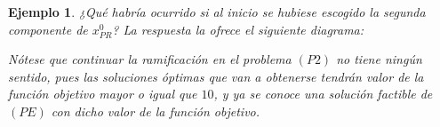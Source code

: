 \documentclass[11pt]{report}
\def\textA{
\scriptsize{$\begin{aligned}[t]
    x^0_{PR} &= (0.8,1.6)^t \\
    z^0_{PR} &= 8.8
\end{aligned}$}
\nodepart{two}
{\scriptsize{$9 \leq z^0_{PE}$}}
}
\def\textG{
\scriptsize{$\begin{aligned}[t]
    x^0_{P1} &= (2,1)^t \\
    z^0_{P1} &= 10
\end{aligned}$}
}
\def\textH{
\scriptsize{$\begin{aligned}[t]
    x^0_{P2} &= (0.66,2)^t \\
    z^0_{P2} &= 10
\end{aligned}$}
}
\theoremstyle{mytheorem}
\theoremstyle{mydefinition}
\theoremstyle{myexample}
\newtheorem*{example}{Ejemplo}
\begin{document}
\begin{example}
\noindent ¿Qué habría ocurrido si al inicio se hubiese escogido la segunda componente de $x^0_{PR}$? La respuesta la ofrece el siguiente diagrama:

\hfill

\begin{center}
\end{center}

Nótese que continuar la ramificación en el problema $(P2)$ no tiene ningún sentido, pues las soluciones óptimas que van a obtenerse tendrán valor de la función objetivo mayor o igual que $10$, y ya se conoce una solución factible de $(PE)$ con dicho valor de la función objetivo.
\end{example}
\end{document}
